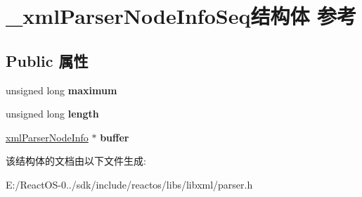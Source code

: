 \hypertarget{struct__xml_parser_node_info_seq}{}\section{\+\_\+xml\+Parser\+Node\+Info\+Seq结构体 参考}
\label{struct__xml_parser_node_info_seq}
\subsection*{Public 属性}
\begin{DoxyCompactItemize}
\item 
\mbox{\label{struct__xml_parser_node_info_seq_aa8546837e510e099b0e8790700b9c8ff}} 
unsigned long {\bfseries maximum}
\item 
\mbox{\label{struct__xml_parser_node_info_seq_a09bd6c0f172702df82cfbef8b03f7e0a}} 
unsigned long {\bfseries length}
\item 
\mbox{\label{struct__xml_parser_node_info_seq_ada2d42841c64e792f483bab9451fdbd4}} 
\hyperlink{struct__xml_parser_node_info}{xml\+Parser\+Node\+Info} $\ast$ {\bfseries buffer}
\end{DoxyCompactItemize}


该结构体的文档由以下文件生成\+:\begin{DoxyCompactItemize}
\item 
E\+:/\+React\+O\+S-\/0../sdk/include/reactos/libs/libxml/parser.\+h\end{DoxyCompactItemize}
